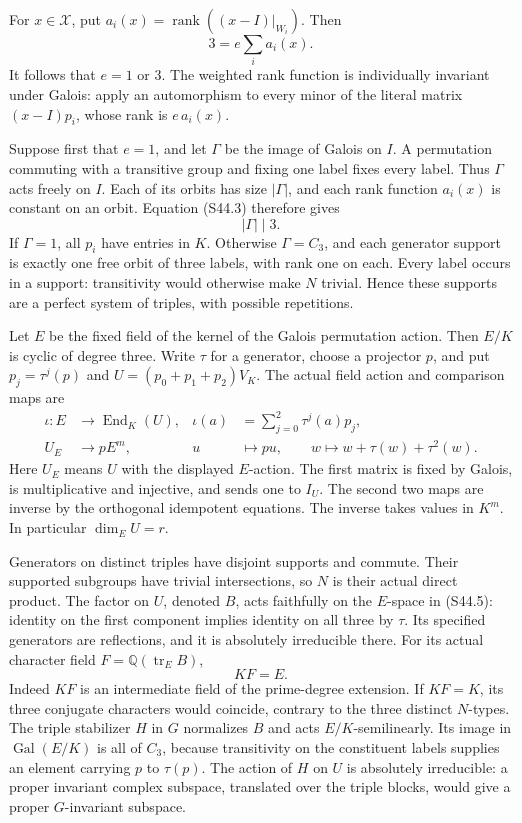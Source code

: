 For \(x\in\mathcal X\), put
\(a_i(x)=\operatorname{rank}((x-I)|_{W_i})\). Then
\[
                3=e\sum_i a_i(x).                         \tag{S44.3}
\]
It follows that \(e=1\) or \(3\). The weighted rank
function is individually invariant under Galois: apply an
automorphism to every minor of the literal matrix
\((x-I)p_i\), whose rank is \(e\,a_i(x)\).

Suppose first that \(e=1\), and let \(\Gamma\) be the
image of Galois on \(I\). A permutation commuting with a
transitive group and fixing one label fixes every label.
Thus \(\Gamma\) acts freely on \(I\). Each of its orbits
has size \(|\Gamma|\), and each rank function \(a_i(x)\)
is constant on an orbit. Equation (S44.3) therefore gives
\[
                            |\Gamma|\mid3.                 \tag{S44.4}
\]
If \(\Gamma=1\), all \(p_i\) have entries in \(K\).
Otherwise \(\Gamma=C_3\), and each generator support is
exactly one free orbit of three labels, with rank one on
each. Every label occurs in a support: transitivity would
otherwise make \(N\) trivial. Hence these supports are a
perfect system of triples, with possible repetitions.

Let \(E\) be the fixed field of the kernel of the Galois
permutation action. Then \(E/K\) is cyclic of degree three.
Write \(\tau\) for a generator, choose a projector \(p\),
and put \(p_j=\tau^j(p)\) and \(U=(p_0+p_1+p_2)V_K\).
The actual field action and comparison maps are
\[
 \begin{aligned}
 \iota:E&\longrightarrow\operatorname{End}_K(U),
 &\iota(a)&=\sum_{j=0}^2\tau^j(a)p_j,\\
 U_E&\longrightarrow pE^m,
 &u&\longmapsto pu,\qquad
 w\longmapsto w+\tau(w)+\tau^2(w).
 \end{aligned}                                             \tag{S44.5}
\]
Here \(U_E\) means \(U\) with the displayed \(E\)-action.
The first matrix is fixed by Galois, is multiplicative and
injective, and sends one to \(I_U\). The second two maps
are inverse by the orthogonal idempotent equations. The
inverse takes values in \(K^m\). In particular \(\dim_EU=r\).

Generators on distinct triples have disjoint supports and
commute. Their supported subgroups have trivial intersections,
so \(N\) is their actual direct product. The factor on
\(U\), denoted \(B\), acts faithfully on the \(E\)-space
in (S44.5): identity on the first component implies identity
on all three by \(\tau\). Its specified generators are
reflections, and it is absolutely irreducible there. For its
actual character field \(F=\mathbb Q(\operatorname{tr}_E B)\),
\[
                               KF=E.                       \tag{S44.6}
\]
Indeed \(KF\) is an intermediate field of the prime-degree
extension. If \(KF=K\), its three conjugate characters
would coincide, contrary to the three distinct \(N\)-types.
The triple stabilizer \(H\) in \(G\) normalizes \(B\)
and acts \(E/K\)-semilinearly. Its image in
\(\operatorname{Gal}(E/K)\) is all of \(C_3\), because
transitivity on the constituent labels supplies an element
carrying \(p\) to \(\tau(p)\).
The action of \(H\) on \(U\) is absolutely irreducible:
a proper invariant complex subspace, translated over the
triple blocks, would give a proper \(G\)-invariant subspace.

